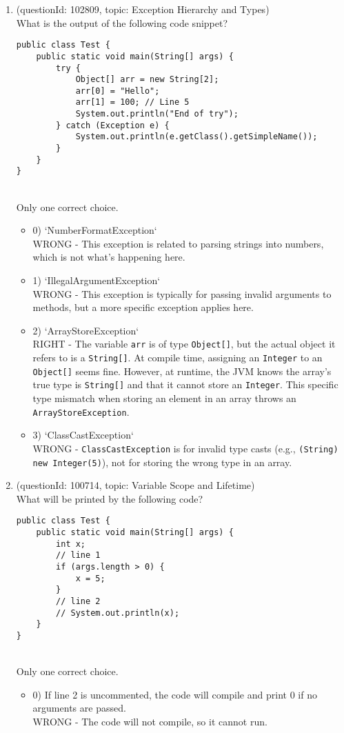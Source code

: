 \documentclass[12pt]{article}
\begin{document}
\begin{enumerate}[label=(\arabic*)]
\begin{itemize}
\end{itemize}
\item (questionId: 102809, topic: Exception Hierarchy and Types) \\ 
What is the output of the following code snippet?
\begin{verbatim}
public class Test {
    public static void main(String[] args) {
        try {
            Object[] arr = new String[2];
            arr[0] = "Hello";
            arr[1] = 100; // Line 5
            System.out.println("End of try");
        } catch (Exception e) {
            System.out.println(e.getClass().getSimpleName());
        }
    }
}
\end{verbatim}
\\ \noindent Only one correct choice. 
\begin{itemize}
\item 0) `NumberFormatException`
 \\ 
WRONG - This exception is related to parsing strings into numbers, which is not what's happening here.

\item 1) `IllegalArgumentException`
 \\ 
WRONG - This exception is typically for passing invalid arguments to methods, but a more specific exception applies here.

\item 2) `ArrayStoreException`
 \\ 
RIGHT - The variable \verb|arr| is of type \verb|Object[]|, but the actual object it refers to is a \verb|String[]|. At compile time, assigning an \verb|Integer| to an \verb|Object[]| seems fine. However, at runtime, the JVM knows the array's true type is \verb|String[]| and that it cannot store an \verb|Integer|. This specific type mismatch when storing an element in an array throws an \verb|ArrayStoreException|.

\item 3) `ClassCastException`
 \\ 
WRONG - \verb|ClassCastException| is for invalid type casts (e.g., \verb|(String) new Integer(5)|), not for storing the wrong type in an array.

\end{itemize}
\item (questionId: 100714, topic: Variable Scope and Lifetime) \\ 
What will be printed by the following code?\n\begin{verbatim}
public class Test {
    public static void main(String[] args) {
        int x;
        // line 1
        if (args.length > 0) {
            x = 5;
        } 
        // line 2
        // System.out.println(x);
    }
}
\end{verbatim}
\\ \noindent Only one correct choice. 
\begin{itemize}
\item 0) If line 2 is uncommented, the code will compile and print 0 if no arguments are passed.
 \\ 
WRONG - The code will not compile, so it cannot run.


\end{itemize}
\end{enumerate}
\end{document}
